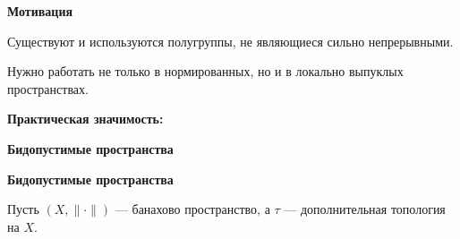\documentclass[11pt]{article}
\begin{document}
\newpage

\begin{center}
{\color{notaeYELLOW}\bfseries\fontsize{44}{52}\selectfont Мотивация}
\end{center}
\vspace*{\fill}
\begin{center}
\fontsize{36}{43}\selectfont
\parbox{\linewidth}{\centering\noindent Существуют и используются полугруппы, не являющиеся сильно непрерывными.
\par}\vspace{0.4in}
\parbox{\linewidth}{\centering\noindent Нужно работать не только в нормированных, но и в локально выпуклых пространствах.
\par}\vspace{0.4in}
\parbox{\linewidth}{\centering\noindent \textbf{Практическая значимость:}
\par}\vspace{0.4in}
\parbox{\linewidth}{\centering{}
\par}\vspace{0.4in}
\parbox{\linewidth}{\centering{}
\par}\vspace{0.4in}
\parbox{\linewidth}{\centering{}
\par}\vspace{0.4in}
\parbox{\linewidth}{\centering{}
\par}\vspace{0.4in}
\end{center}
\vspace*{\fill}

\newpage

\begin{center}
{\color{notaeYELLOW}\bfseries\fontsize{44}{52}\selectfont Бидопустимые пространства}
\end{center}
\vspace*{\fill}
\begin{center}
\fontsize{36}{43}\selectfont
\end{center}
\vspace*{\fill}

\newpage

\begin{center}
{\color{notaeYELLOW}\bfseries\fontsize{44}{52}\selectfont Бидопустимые пространства}
\end{center}
\vspace*{\fill}
\begin{center}
\fontsize{36}{43}\selectfont
\parbox{\linewidth}{\centering\noindent Пусть $(X,\|\cdot\|)$ --- банахово пространство, а $\tau$ --- дополнительная топология на $X$.
\par}\vspace{0.4in}
\end{center}
\vspace*{\fill}
\end{document}
